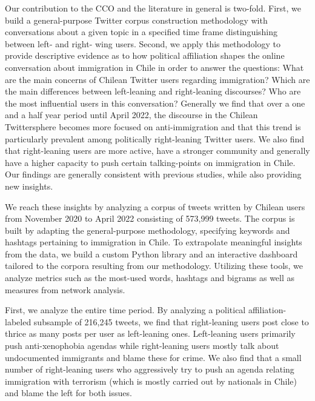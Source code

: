     Our contribution to the CCO and the literature in general is two-fold. First, we build a general-purpose Twitter corpus construction methodology with conversations about a given topic in a specified time frame distinguishing between left- and right- wing users. Second, we apply this methodology to provide descriptive evidence as to how political affiliation shapes the online conversation about immigration in Chile in order to answer the questions: What are the main concerns of Chilean Twitter users regarding immigration? Which are the main differences between left-leaning and right-leaning discourses? Who are the most influential users in this conversation? Generally we find that over a one and a half year period until April 2022, the discourse in the Chilean Twittersphere becomes more focused on anti-immigration and that this trend is particularly prevalent among politically right-leaning Twitter users. We also find that right-leaning users are more active, have a stronger community and generally have a higher capacity to push certain talking-points on immigration in Chile. Our findings are generally consistent with previous studies, while also providing new insights. 
    
    We reach these insights by analyzing a corpus of tweets written by Chilean users from November 2020 to April 2022 consisting of 573,999 tweets. The corpus is built by adapting the general-purpose methodology, specifying keywords and hashtags pertaining to immigration in Chile. To extrapolate meaningful insights from the data, we build a custom Python library and an interactive dashboard tailored to the corpora resulting from our methodology. Utilizing these tools, we analyze metrics such as the most-used words, hashtags and bigrams as well as measures from network analysis. 
    
    First, we analyze the entire time period. By analyzing a political affiliation-labeled subsample of 216,245 tweets, we find that right-leaning users post close to thrice as many posts per user as left-leaning ones. Left-leaning users primarily push anti-xenophobia agendas while right-leaning users mostly talk about undocumented immigrants and blame these for crime. We also find that a small number of right-leaning users who aggressively try to push an agenda relating immigration with terrorism (which is mostly carried out by nationals in Chile) and blame the left for both issues. 
    
